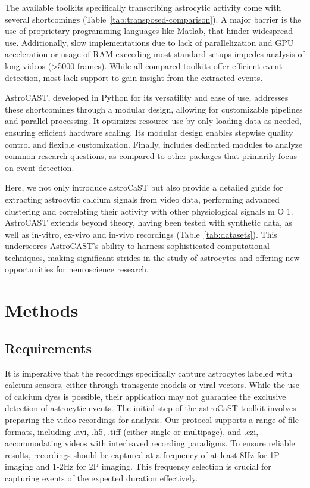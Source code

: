 \documentclass[utf8]{FrontiersinHarvard}
\newcommand{\fref}{ m O{} }{ (Figure~\ref{fig:#1}\IfValueT{#2}{\,#2})}
\newcommand{\tref}[1]{ (Table~\ref{tab:#1})}
\begin{document}
    The available toolkits specifically transcribing astrocytic activity come with several shortcomings\tref{transposed-comparison}. A major barrier is the use of proprietary programming languages like Matlab, that hinder widespread use. Additionally, slow implementations due to lack of parallelization and \ac{GPU} acceleration or usage of RAM exceeding most standard setups impedes analysis of long videos (>5000 frames). While all compared toolkits offer efficient event detection, most lack support to gain insight from the extracted events.

    AstroCAST, developed in Python for its versatility and ease of use, addresses these shortcomings through a modular design, allowing for customizable pipelines and parallel processing. It optimizes resource use by only loading data as needed, ensuring efficient hardware scaling. Its modular design enables stepwise quality control and flexible customization. Finally,  includes dedicated modules to analyze common research questions, as compared to other packages that primarily focus on event detection.

    Here, we not only introduce astroCaST but also provide a detailed guide for extracting astrocytic calcium signals from video data, performing advanced clustering and correlating their activity with other physiological signals\fref{1}. AstroCAST extends beyond theory, having been tested with synthetic data, as well as in-vitro, ex-vivo and in-vivo recordings\tref{datasets}. This underscores AstroCAST’s ability to harness sophisticated computational techniques, making significant strides in the study of astrocytes and offering new opportunities for neuroscience research.


    \section{Methods}

    \subsection{Requirements}
    It is imperative that the recordings specifically capture astrocytes labeled with calcium sensors, either through transgenic models or viral vectors. While the use of calcium dyes is possible, their application may not guarantee the exclusive detection of astrocytic events. The initial step of the astroCaST toolkit involves preparing the video recordings for analysis. Our protocol supports a range of file formats, including .avi, .h5, .tiff (either single or multipage), and .czi, accommodating videos with interleaved recording paradigms. To ensure reliable results, recordings should be captured at a frequency of at least 8Hz for \ac{1P} imaging and 1-2Hz for \ac{2P} imaging. This frequency selection is crucial for capturing events of the expected duration effectively.
\end{document}
